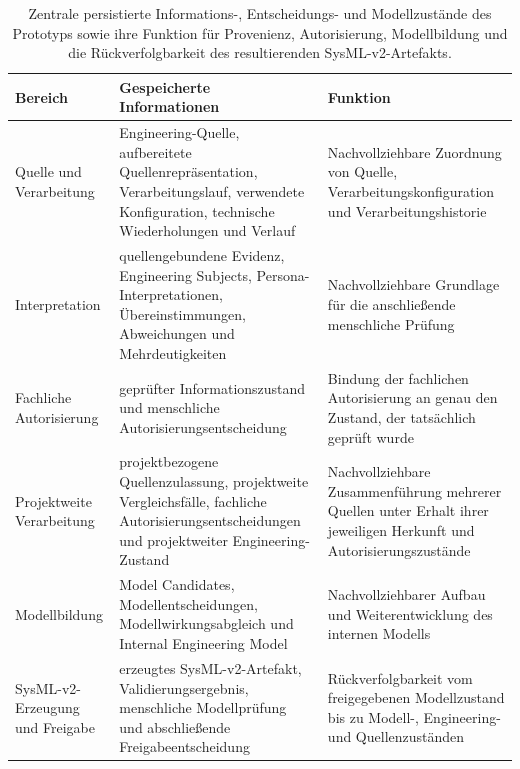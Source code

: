 \begin{table}[htbp]
    \centering
    \small
    \caption[Persistierte Informationen des Prototyps]{
        Zentrale persistierte Informations-, Entscheidungs- und Modellzustände
        des Prototyps sowie ihre Funktion für Provenienz, Autorisierung,
        Modellbildung und die Rückverfolgbarkeit des resultierenden
        SysML-v2-Artefakts.}
    \label{tab:implementation_persisted_artifacts}
    \begin{tabular}{p{3.2cm}p{5.0cm}p{5.7cm}}
        \hline
        \textbf{Bereich} &
        \textbf{Gespeicherte Informationen} &
        \textbf{Funktion} \\
        \hline

        Quelle und Verarbeitung &
        Engineering-Quelle, aufbereitete Quellenrepräsentation,
        Verarbeitungslauf, verwendete Konfiguration,
        technische Wiederholungen und Verlauf &
        Nachvollziehbare Zuordnung von Quelle,
        Verarbeitungskonfiguration und Verarbeitungshistorie \\

        Interpretation &
        quellengebundene Evidenz, Engineering Subjects,
        Persona-Interpretationen, Übereinstimmungen,
        Abweichungen und Mehrdeutigkeiten &
        Nachvollziehbare Grundlage für die anschließende
        menschliche Prüfung \\

        Fachliche Autorisierung &
        geprüfter Informationszustand und menschliche
        Autorisierungsentscheidung &
        Bindung der fachlichen Autorisierung an genau den Zustand,
        der tatsächlich geprüft wurde \\

        Projektweite Verarbeitung &
        projektbezogene Quellenzulassung, projektweite
        Vergleichsfälle, fachliche Autorisierungsentscheidungen
        und projektweiter Engineering-Zustand &
        Nachvollziehbare Zusammenführung mehrerer Quellen unter
        Erhalt ihrer jeweiligen Herkunft und Autorisierungszustände \\

        Modellbildung &
        Model Candidates, Modellentscheidungen,
        Modellwirkungsabgleich und Internal Engineering Model &
        Nachvollziehbarer Aufbau und Weiterentwicklung des
        internen Modells \\

        SysML-v2-Erzeugung und Freigabe &
        erzeugtes SysML-v2-Artefakt, Validierungsergebnis,
        menschliche Modellprüfung und abschließende
        Freigabeentscheidung &
        Rückverfolgbarkeit vom freigegebenen Modellzustand bis zu
        Modell-, Engineering- und Quellenzuständen \\
        \hline
    \end{tabular}
\end{table}

